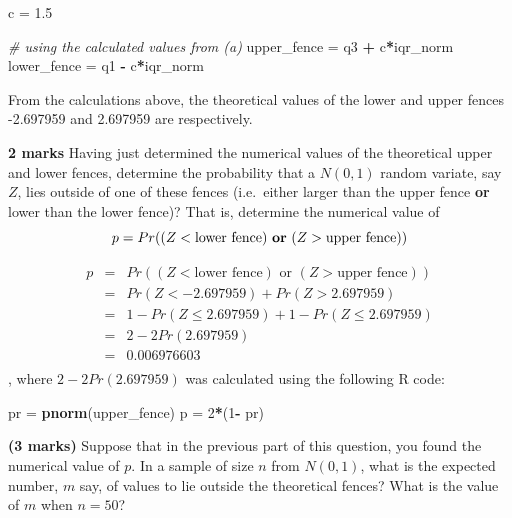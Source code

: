 \documentclass[9pt,letter]{article}
\newenvironment{Shaded}{\begin{snugshade}}{\end{snugshade}}
\newcommand{\KeywordTok}[1]{\textcolor[rgb]{0.13,0.29,0.53}{\textbf{#1}}}
\newcommand{\DecValTok}[1]{\textcolor[rgb]{0.00,0.00,0.81}{#1}}
\newcommand{\FloatTok}[1]{\textcolor[rgb]{0.00,0.00,0.81}{#1}}
\newcommand{\StringTok}[1]{\textcolor[rgb]{0.31,0.60,0.02}{#1}}
\newcommand{\CommentTok}[1]{\textcolor[rgb]{0.56,0.35,0.01}{\textit{#1}}}
\newcommand{\OperatorTok}[1]{\textcolor[rgb]{0.81,0.36,0.00}{\textbf{#1}}}
\newcommand{\NormalTok}[1]{#1}
\begin{document}
\begin{Shaded}
\begin{Highlighting}[]
\NormalTok{c =}\StringTok{ }\FloatTok{1.5}

\CommentTok{# using the calculated values from (a)}
\NormalTok{upper_fence =}\StringTok{ }\NormalTok{q3 }\OperatorTok{+}\StringTok{ }\NormalTok{c}\OperatorTok{*}\NormalTok{iqr_norm}
\NormalTok{lower_fence =}\StringTok{ }\NormalTok{q1 }\OperatorTok{-}\StringTok{ }\NormalTok{c}\OperatorTok{*}\NormalTok{iqr_norm}
\end{Highlighting}
\end{Shaded}

From the calculations above, the theoretical values of the lower and
upper fences -2.697959 and 2.697959 are respectively.

\item 

\textbf{2 marks} Having just determined the numerical values of the
theoretical upper and lower fences, determine the probability that a
\(N(0,1)\) random variate, say \(Z\), lies outside of one of these
fences (i.e.~either larger than the upper fence \textbf{or} lower than
the lower fence)? That is, determine the numerical value of
\[p = Pr((Z < \mbox{lower fence}) \mbox{ {\bf or} } (Z > \mbox{upper fence})) \]

\[
\begin{array}{rcll}
p &=& Pr((Z < \mbox{lower fence}) \text{ or } (Z > \mbox{upper fence}))\\
&=& Pr(Z < -2.697959) + Pr(Z > 2.697959)\\
&=& 1 - Pr(Z \le 2.697959) + 1 - Pr(Z \le 2.697959)\\
&=& 2 - 2Pr(2.697959)\\
&=& 0.006976603\\
\end{array}
\] , where \(2 - 2Pr(2.697959)\) was calculated using the following R
code:

\begin{Shaded}
\begin{Highlighting}[]
\NormalTok{pr =}\StringTok{ }\KeywordTok{pnorm}\NormalTok{(upper_fence)}
\NormalTok{p =}\StringTok{ }\DecValTok{2}\OperatorTok{*}\NormalTok{(}\DecValTok{1}\OperatorTok{-}\StringTok{ }\NormalTok{pr)}
\end{Highlighting}
\end{Shaded}

\item 

\textbf{(3 marks)} Suppose that in the previous part of this question,
you found the numerical value of \(p\). In a sample of size \(n\) from
\(N(0,1)\), what is the expected number, \(m\) say, of values to lie
outside the theoretical fences? What is the value of \(m\) when
\(n=50\)?
\end{document}
